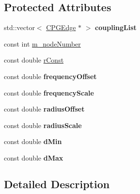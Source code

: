 \subsection*{Protected Attributes}
\begin{DoxyCompactItemize}
\item 
\hypertarget{class_c_p_g_node_a025b9eb14954cced84cd435712ccdd5e}{std\-::vector$<$ \hyperlink{class_c_p_g_edge}{C\-P\-G\-Edge} $\ast$ $>$ {\bfseries coupling\-List}}\label{class_c_p_g_node_a025b9eb14954cced84cd435712ccdd5e}

\item 
const int \hyperlink{class_c_p_g_node_ac770248ea013b912e62f51a994c1490f}{m\-\_\-node\-Number}
\item 
const double \hyperlink{class_c_p_g_node_a971fd2b7f0d4c7ac565d2a94ec84f7c5}{r\-Const}
\item 
\hypertarget{class_c_p_g_node_aee163d068ad4ff8719f5e875d6a24149}{const double {\bfseries frequency\-Offset}}\label{class_c_p_g_node_aee163d068ad4ff8719f5e875d6a24149}

\item 
\hypertarget{class_c_p_g_node_a1a7944952e99ab75e038f792ff7a0c7c}{const double {\bfseries frequency\-Scale}}\label{class_c_p_g_node_a1a7944952e99ab75e038f792ff7a0c7c}

\item 
\hypertarget{class_c_p_g_node_ab1d6904704ebcfbaee4c4bf97e258903}{const double {\bfseries radius\-Offset}}\label{class_c_p_g_node_ab1d6904704ebcfbaee4c4bf97e258903}

\item 
\hypertarget{class_c_p_g_node_ae89240e1b1bde3fe1d6270ba78fe33d0}{const double {\bfseries radius\-Scale}}\label{class_c_p_g_node_ae89240e1b1bde3fe1d6270ba78fe33d0}

\item 
\hypertarget{class_c_p_g_node_a7d383b823c83c656b3f6b10e74b3acb5}{const double {\bfseries d\-Min}}\label{class_c_p_g_node_a7d383b823c83c656b3f6b10e74b3acb5}

\item 
\hypertarget{class_c_p_g_node_a64d55ae6c023a9b8325ef6ded01c83fd}{const double {\bfseries d\-Max}}\label{class_c_p_g_node_a64d55ae6c023a9b8325ef6ded01c83fd}

\end{DoxyCompactItemize}


\subsection{Detailed Description}


